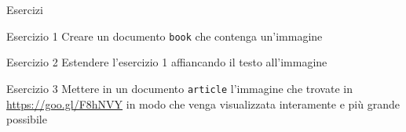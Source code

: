 \begin{frame}{Esercizi}

\begin{block}{Esercizio 1}
Creare un documento \texttt{book} che contenga un'immagine
\end{block}

\begin{block}{Esercizio 2}
Estendere l'esercizio 1 affiancando il testo all'immagine
\end{block}

\begin{block}{Esercizio 3}
Mettere in un documento \texttt{article} l'immagine che trovate in
\url{https://goo.gl/F8hNVY} in modo che venga visualizzata
interamente e più grande possibile
\end{block}

\end{frame}
